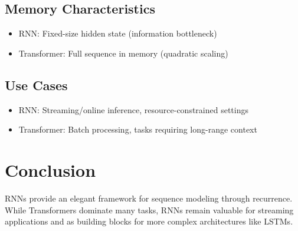 \documentclass[12pt]{article}
\begin{document}
\subsection{Memory Characteristics}
\begin{itemize}
    \item RNN: Fixed-size hidden state (information bottleneck)
    \item Transformer: Full sequence in memory (quadratic scaling)
\end{itemize}

\subsection{Use Cases}
\begin{itemize}
    \item RNN: Streaming/online inference, resource-constrained settings
    \item Transformer: Batch processing, tasks requiring long-range context
\end{itemize}

\section{Conclusion}
RNNs provide an elegant framework for sequence modeling through recurrence. While Transformers dominate many tasks, RNNs remain valuable for streaming applications and as building blocks for more complex architectures like LSTMs.
\end{document}
